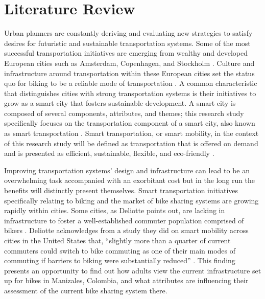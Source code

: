 \documentclass[12pt]{article}
\begin{document}

\section*{Literature Review}
Urban planners are constantly deriving and evaluating new strategies to satisfy desires for futuristic and sustainable 
transportation systems. Some of the most successful transportation initiatives are emerging from wealthy and developed 
European cities such as Amsterdam, Copenhagen, and Stockholm \cite{DeliotteReport}. Culture and infrastructure around transportation 
within these European cities set the status quo for biking to be a reliable mode of transportation \cite{DeliotteReport}.  A common characteristic 
that distinguishes cities with strong transportation systems is their initiatives to grow as a smart city that 
fosters sustainable development. A smart city is composed of several components, attributes, and themes; this research study 
specifically focuses on the transportation component of a smart city, also known as smart transportation \cite{DefiningSmartCity}. 
Smart transportation, or smart mobility, in the context of this research study will be defined as transportation that is offered on demand
and is presented as efficient, sustainable, flexible, and eco-friendly \cite{SmartTransportation}. 

Improving transportation systems’ design and infrastructure can lead to be an 
overwhelming task accompanied with an exorbitant cost but in the long run the benefits will distinctly present themselves. 
Smart transportation initiatives specifically relating to biking and the market of bike sharing systems are growing rapidly within
cities. Some cities, as Deliotte points out, are lacking in infrastructure to foster a well-established commuter population comprised of 
bikers \cite{DeliotteReport}. Deliotte acknowledges from a study they did on smart mobility across cities in the United States that, “slightly 
more than a quarter of current commuters could switch to bike commuting as one of their main modes of commuting if barriers 
to biking were substantially reduced” \cite{DeliotteReport}. This finding presents an opportunity to find out how adults view the current infrastructure
set up for bikes in Manizales, Colombia, and what attributes are influencing their assessment of the current bike sharing system there.
\end{document}
